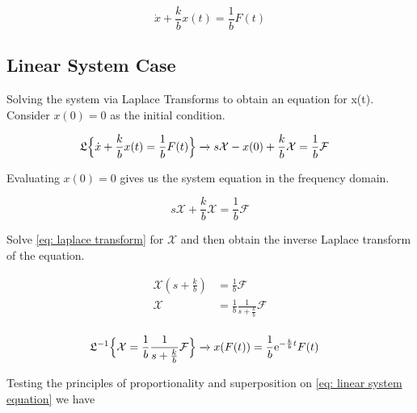 \begin{equation}
 \dot{x} + \frac{k}{b} x(t) = \frac{1}{b} F(t)
 \label{eq: system equation}
\end{equation}

\subsection{Linear System Case}

Solving the system via Laplace Transforms to obtain an 
equation for x(t). Consider $x(0) = 0$ as the initial 
condition.

\begin{equation}
 \begin{split}
  \mathfrak{L} \Bigl \{ \dot{x} + \frac{k}{b} x(t)  = 
\frac{1}{b} F(t) \Bigr \} & \xrightarrow{} s \mathcal{X} - 
x(0) + \frac{k}{b} \mathcal{X} = \frac{1}{b} \mathcal{F}
 \end{split}
 \label{eq: general laplace transform}
\end{equation}

Evaluating $x(0)=0$ gives us the system equation in the 
frequency domain.

\begin{equation}
 s \mathcal{X} + \frac{k}{b} \mathcal{X} = \frac{1}{b}
\mathcal{F}
\label{eq: laplace transform}
\end{equation}

Solve \ref{eq: laplace transform} for $\mathcal{X}$ and 
then obtain the inverse Laplace transform of the equation.

\begin{equation*}
 \begin{split}
  \mathcal{X} (s + \frac{k}{b}) & = \frac{1}{b} 
\mathcal{F}\\
\mathcal{X} & = \frac{1}{b} \frac{1}{s + \frac{k}{b}}
\mathcal{F}\\
 \end{split}
\end{equation*}


\begin{equation}
 \begin{split}
  \mathfrak{L}^{-1} \Bigl \{ \mathcal{X}  = \frac{1}{b} 
\frac{1}{s + \frac{k}{b}}
\mathcal{F}   \Bigr\} & \xrightarrow{} x(F(t)) = 
\frac{1}{b} \mathrm{e}^{-\frac{k}{b}t} F(t)
 \end{split}
 \label{eq: linear system equation}
\end{equation}

Testing the principles of proportionality and superposition 
on \ref{eq: linear system equation} we have

